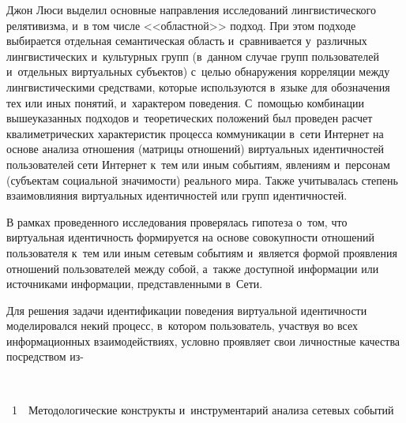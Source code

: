 \begin{multicols}{2}
  Джон Люси выделил основные направления исследований лингвистического 
релятивизма, и~в том числе %
<<областной>> 
подход. При этом подходе выбирается отдельная семантическая область 
и~сравнивается у~различных лингвистических и~культурных групп (в~данном 
случае групп пользователей и~отдельных виртуальных субъектов) 
с~\mbox{целью} обнаружения корреляции между лингвистическими 
средствами, которые используются в~языке для обозначения тех или иных 
понятий, и~характером поведения. С~по\-мощью комбинации вышеуказанных 
подходов и~теоретических положений был проведен расчет квалиметрических 
характеристик процесса коммуникации в~сети Интернет на основе анализа 
отношения (матрицы отношений) виртуальных идентичностей пользователей 
сети Интернет к~тем или иным событиям, явлениям и~персонам (субъектам 
социальной значимости) реального мира. Также учитывалась степень 
взаимовлияния виртуальных идентичностей или групп идентичностей.
  
  В рамках проведенного исследования проверялась гипотеза о~том, что 
виртуальная идентичность формируется на основе совокупности отношений 
пользователя к~тем или иным сетевым событиям и~является формой проявления 
отношений пользователей между собой, а~также доступной информации или 
источниками информации, представленными в~Сети.
  
  Для решения задачи идентификации поведения виртуальной идентичности 
моделировался некий процесс, в~котором пользователь, участвуя во всех 
информационных взаимодействиях, условно проявляет свои личностные 
качества посредством из-\linebreak\vspace*{-12pt}

 { \begin{center}  %
 \vspace*{-3pt}
 \mbox{%
\epsfxsize=77.575mm
}

\end{center}


\noindent
{{\figurename~1}\ \ \small{Методологические конструкты и~инструментарий анализа сетевых событий}}

}


\end{multicols}
